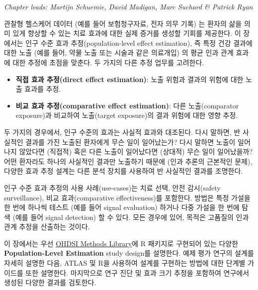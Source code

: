 \documentclass[11pt]{book}
\providecommand{\tightlist}{%
  \setlength{\itemsep}{0pt}\setlength{\parskip}{0pt}}
\theoremstyle{definition}
\theoremstyle{definition}
\theoremstyle{definition}
\theoremstyle{remark}
\begin{document}
\emph{Chapter leads: Martijn Schuemie, David Madigan, Marc Suchard \&
Patrick Ryan}


관찰형 헬스케어 데이터 (예를 들어 보험청구자료, 전자 의무 기록) 는
환자의 삶을 의미 있게 향상할 수 있는 치료 효과에 대한 실제 증거를 생성할
기회를 제공한다. 이 장에서는 인구 수준 효과 추정(population-level effect
estimation), 즉 특정 건강 결과에 대한 노출 (예를 들어, 약물 노출 또는
시술과 같은 의료개입) 의 평균 인과 관계 효과에 대한 추정에 초점을
맞춘다. 두 가지의 다른 추정 업무를 고려한다.

\begin{itemize}
\tightlist
\item
  \textbf{직접 효과 추정(direct effect estimation)}: 노출 위험과 결과의
  위험에 대한 노출 효과를 추정. 
\item
  \textbf{비교 효과 추정(comparative effect estimation)}: 다른
  노출(comparator exposure)과 비교하여 노출(target exposure)의 결과
  위험에 대한 영향 추정. 
\end{itemize}

두 가지의 경우에서, 인구 수준의 효과는 사실적 효과와 대조된다. 다시
말하면, 반 사실적인 결과를 가진 노출된 환자에게 무슨 일이 일어났는가?
다시 말하면 노출이 일어나지 않았다면 (직접적) 혹은 다른 노출이
일어났다면 (상대적) 무슨 일이 일어났을까? 어떤 환자라도 하나의 사실적인
결과만 노출하기 때문에 (인과 추론의 근본적인 문제), 다양한 효과 추정
설계는 다른 분석 장치를 사용하여 반 사실적인 결과를 조명한다.

인구 수준 효과 추정의 사용 사례(use-cases)는 치료 선택, 안전 감시(safety
surveillance), 비교 효과(comparative effectiveness)를 포함한다. 방법은
특정 가설을 한 번에 하나씩 테스트 (예를 들어 signal evaluation) 하거나
다중 가설을 한 번에 탐색 (예를 들어 signal detection) 할 수 있다. 모든
경우에 있어, 목적은 고품질의 인과 관계 추정을 산출하는 것이다.

이 장에서는 우선 \href{https://ohdsi.github.io/MethodsLibrary/}{OHDSI
Methods Library}에 R 패키지로 구현되어 있는 다양한
\textbf{Population-Level Estimation} study design를 설명한다. 예제 평가
연구의 설계를 자세히 설명한 다음, ATLAS 및 R을 사용하여 설계를 구현하는
방법에 대한 단계별 가이드를 또한 설명한다. 마지막으로 연구 진단 및 효과
크기 추정을 포함하여 연구에서 생성된 다양한 결과를 검토한다.
\end{document}
